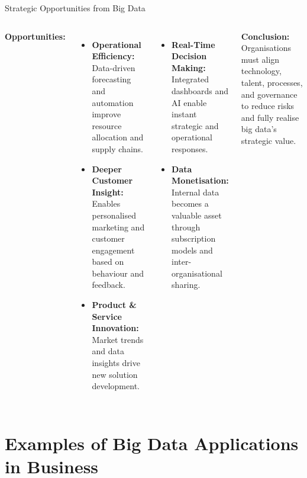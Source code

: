 \documentclass[aspectratio=169, table]{beamer}
\begin{document}
\begin{frame}[fragile]{Strategic Opportunities from Big Data}
	\vspace{20pt}
	\small
	\begin{columns}[T]
		\textbf{Opportunities:}
		\begin{itemize}
			\item \textbf{Operational Efficiency:} Data-driven forecasting and automation improve resource allocation and supply chains.
			\item \textbf{Deeper Customer Insight:} Enables personalised marketing and customer engagement based on behaviour and feedback.
			\item \textbf{Product \& Service Innovation:} Market trends and data insights drive new solution development.
		\end{itemize}
		
		\begin{itemize}
			\item \textbf{Real-Time Decision Making:} Integrated dashboards and AI enable instant strategic and operational responses.
			\item \textbf{Data Monetisation:} Internal data becomes a valuable asset through subscription models and inter-organisational sharing.
		\end{itemize}
		
		\textbf{Conclusion:}  
		Organisations must align technology, talent, processes, and governance to reduce risks and fully realise big data’s strategic value.
	\end{columns}
\end{frame}

\section{Examples of Big Data Applications in Business}
\end{document}
